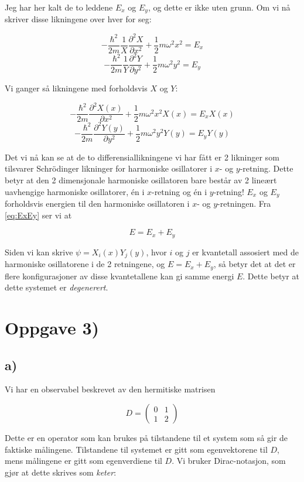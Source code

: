 \documentclass[a4paper,norsk, 10pt]{article}
\numberwithin{equation}{section}
\begin{document}
Jeg har her kalt de to leddene $E_x$ og $E_y$, og dette er ikke uten grunn. Om vi nå skriver disse likningene over hver for seg:

$$
-\frac{\hbar^2}{2m}\frac{1}{X}\frac{\partial^2 X}{\partial x^2} + \frac{1}{2}m\omega^2x^2 = E_x
$$
$$
-\frac{\hbar^2}{2m}\frac{1}{Y}\frac{\partial^2 Y}{\partial y^2} + \frac{1}{2}m\omega^2y^2 = E_y
$$

Vi ganger så likningene med forholdsvis $X$ og $Y$:

$$
-\frac{\hbar^2}{2m}\frac{\partial^2 X(x)}{\partial x^2} + \frac{1}{2}m\omega^2x^2X(x) = E_xX(x)
$$
$$
-\frac{\hbar^2}{2m}\frac{\partial^2 Y(y)}{\partial y^2} + \frac{1}{2}m\omega^2y^2Y(y) = E_yY(y)
$$

Det vi nå kan se at de to differensiallikningene vi har fått er 2 likninger som tilsvarer Schrödinger likninger for harmoniske osillatorer i $x$- og $y$-retning. Dette betyr at den 2 dimensjonale harmoniske osillatoren bare består av 2 lineært uavhengige harmoniske osillatorer, én i $x$-retning og én i $y$-retning! $E_x$ og $E_y$ forholdsvis energien til den harmoniske osillatoren i $x$- og $y$-retningen. Fra \ref{eq:ExEy} ser vi at

$$
E = E_x +E_y
$$

Siden vi kan skrive $\psi = X_i(x)Y_j(y)$, hvor $i$ og $j$ er kvantetall assosiert med de harmoniske osillatorene i de 2 retningene, og $E = E_x + E_y$, så betyr det at det er flere konfigurasjoner av disse kvantetallene kan gi samme energi $E$. Dette betyr at dette systemet er \textit{degenerert}.

\section{Oppgave 3)}

\subsection*{a)}
Vi har en observabel beskrevet av den hermitiske matrisen

\begin{equation}
D =
\begin{pmatrix}
0 &1\\
1 &2
\end{pmatrix}
\end{equation}

Dette er en operator som kan brukes på tilstandene til et system som så gir de faktiske målingene. Tilstandene til systemet er gitt som egenvektorene til $D$, mens målingene er gitt som egenverdiene til $D$. Vi bruker Dirac-notasjon, som gjør at dette skrives  som \textit{keter}:
\end{document}
